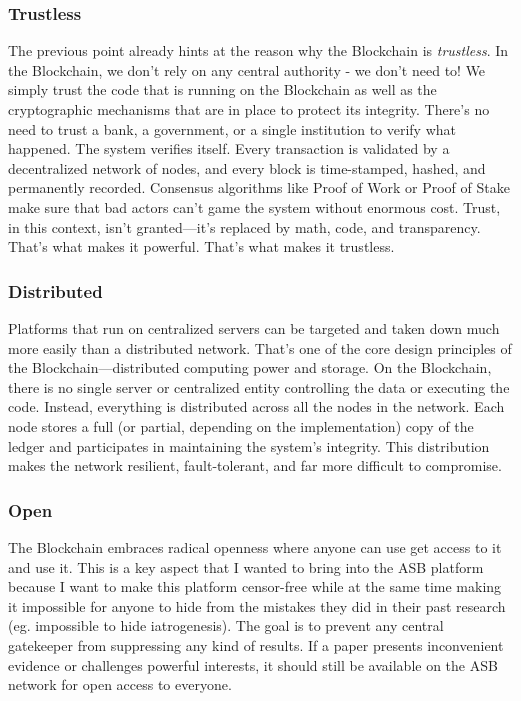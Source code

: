 \documentclass{article}
\begin{document}
\subsubsection{Trustless}
The previous point already hints at the reason why the Blockchain is \emph{trustless}. In the Blockchain, we don't rely on any central authority - we don't need to! We simply trust the code that is running on the Blockchain as well as the cryptographic mechanisms that are in place to protect its integrity.
There's no need to trust a bank, a government, or a single institution to verify what happened. The system verifies itself. Every transaction is validated by a decentralized network of nodes, and every block is time-stamped, hashed, and permanently recorded. Consensus algorithms like Proof of Work or Proof of Stake make sure that bad actors can’t game the system without enormous cost. Trust, in this context, isn't granted—it's replaced by math, code, and transparency. That's what makes it powerful. That’s what makes it trustless.

\subsubsection{Distributed}
Platforms that run on centralized servers can be targeted and taken down much more easily than a distributed network. That’s one of the core design principles of the Blockchain—distributed computing power and storage. On the Blockchain, there is no single server or centralized entity controlling the data or executing the code. Instead, everything is distributed across all the nodes in the network. Each node stores a full (or partial, depending on the implementation) copy of the ledger and participates in maintaining the system’s integrity. This distribution makes the network resilient, fault-tolerant, and far more difficult to compromise.

\subsubsection{Open}
The Blockchain embraces radical openness where anyone can use get access to it and use it. This is a key aspect that I wanted to bring into the ASB platform because I want to make this platform censor-free while at the same time making it impossible for anyone to hide from the mistakes they did in their past research (eg. impossible to hide iatrogenesis). The goal is to prevent any central gatekeeper from suppressing any kind of results. If a paper presents inconvenient evidence or challenges powerful interests, it should still be available on the ASB network for open access to everyone.
\end{document}
